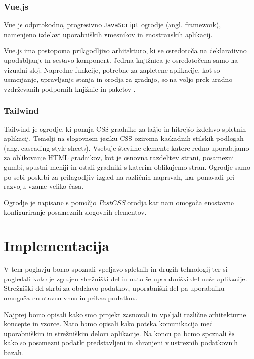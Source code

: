 \documentclass[a4paper, 12pt]{book}
\begin{document}
\subsection{Vue.js}
\label{vue-js-section}
Vue je odprtokodno, progresivno \verb=JavaScript= ogrodje (angl. framework), namenjeno izdelavi uporabniških vmesnikov in enostranskih aplikacij.

Vue.js ima postopoma prilagodljivo arhitekturo, ki se osredotoča na deklarativno upodabljanje in sestavo komponent. Jedrna knjižnica je osredotočena samo na vizualni sloj. Napredne funkcije, potrebne za zapletene aplikacije, kot so usmerjanje, upravljanje stanja in orodja za gradnjo, so na voljo prek uradno vzdrževanih podpornih knjižnic in paketov \cite{vue-js-what-is}.

 \subsection{Tailwind}
\label{tailwind-section}
Tailwind je ogrodje, ki ponuja CSS gradnike za lažjo in hitrejšo izdelavo spletnih aplikacij. Temelji na slogovnem jeziku CSS oziroma kaskadnih stilskih podlogah (ang. cascading style sheets). Vsebuje številne elemente katere redno uporabljamo za oblikovanje HTML gradnikov, kot je osnovna razdelitev strani, posamezni gumbi, spustni meniji in ostali gradniki s katerim oblikujemo stran. Ogrodje samo po sebi poskrbi za prilagodljiv izgled na različnih napravah, kar ponavadi pri razvoju vzame veliko časa. 

Ogrodje je napisano s pomočjo $PostCSS$ orodja kar nam omogoča enostavno konfiguriranje posameznih slogovnih elementov. 

\chapter{Implementacija}
V tem poglavju bomo spoznali vpeljavo spletnih in drugih tehnologij ter si pogledali kako je zgrajen strežniški del in nato še uporabniški del naše aplikacije. Strežniški del skrbi za obdelavo podatkov, uporabniški del pa uporabniku omogoča enostaven vnos in prikaz podatkov.

Najprej bomo opisali kako smo projekt zasnovali in vpeljali različne arhitekturne koncepte in vzorce. Nato bomo opisali kako poteka komunikacija med uporabniškim in strežniškim delom aplikacije. Na koncu pa bomo spoznali še kako so posamezni podatki predstavljeni in shranjeni v ustreznih podatkovnih bazah. 
\end{document}
